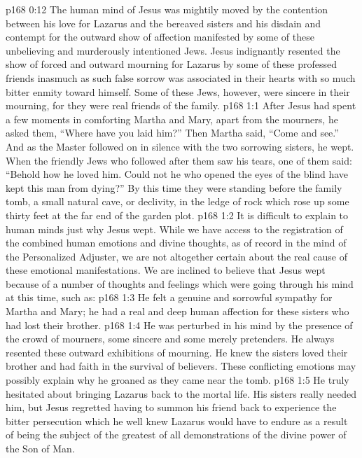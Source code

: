 \vs p168 0:12 The human mind of Jesus was mightily moved by the contention between his love for Lazarus and the bereaved sisters and his disdain and contempt for the outward show of affection manifested by some of these unbelieving and murderously intentioned Jews. Jesus indignantly resented the show of forced and outward mourning for Lazarus by some of these professed friends inasmuch as such false sorrow was associated in their hearts with so much bitter enmity toward himself. Some of these Jews, however, were sincere in their mourning, for they were real friends of the family.
\vs p168 1:1 After Jesus had spent a few moments in comforting Martha and Mary, apart from the mourners, he asked them, \textcolor{ubdarkred}{“Where have you laid him?”} Then Martha said, “Come and see.” And as the Master followed on in silence with the two sorrowing sisters, he wept. When the friendly Jews who followed after them saw his tears, one of them said: “Behold how he loved him. Could not he who opened the eyes of the blind have kept this man from dying?” By this time they were standing before the family tomb, a small natural cave, or declivity, in the ledge of rock which rose up some thirty feet at the far end of the garden plot.
\vs p168 1:2 \pc It is difficult to explain to human minds just why Jesus wept. While we have access to the registration of the combined human emotions and divine thoughts, as of record in the mind of the Personalized Adjuster, we are not altogether certain about the real cause of these emotional manifestations. We are inclined to believe that Jesus wept because of a number of thoughts and feelings which were going through his mind at this time, such as:
\vs p168 1:3 \bibnobreakspace He felt a genuine and sorrowful sympathy for Martha and Mary; he had a real and deep human affection for these sisters who had lost their brother.
\vs p168 1:4 \pc {}\bibnobreakspace He was perturbed in his mind by the presence of the crowd of mourners, some sincere and some merely pretenders. He always resented these outward exhibitions of mourning. He knew the sisters loved their brother and had faith in the survival of believers. These conflicting emotions may possibly explain why he groaned as they came near the tomb.
\vs p168 1:5 \pc {}\bibnobreakspace He truly hesitated about bringing Lazarus back to the mortal life. His sisters really needed him, but Jesus regretted having to summon his friend back to experience the bitter persecution which he well knew Lazarus would have to endure as a result of being the subject of the greatest of all demonstrations of the divine power of the Son of Man.
